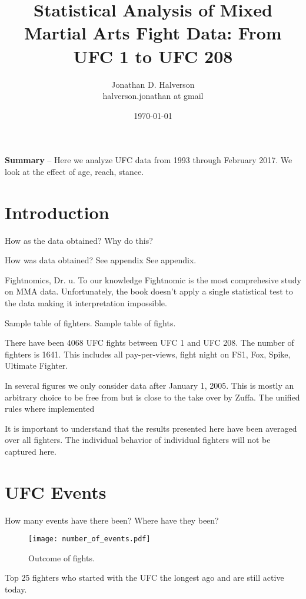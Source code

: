 \documentclass[12pt]{article}
\title{\Huge Statistical Analysis of Mixed Martial Arts Fight Data: From UFC 1 to UFC 208}
\date{\Large \today}
\author{\Large Jonathan D. Halverson\\ \tiny halverson.jonathan at gmail}
\begin{document}
\maketitle
\noindent
\textbf{Summary} -- Here we analyze UFC data from 1993 through February 2017. We look at the effect
of age, reach, stance.

\section{Introduction}

How as the data obtained? Why do this?

How was data obtained? See appendix See appendix.

Fightnomics, Dr. u.
To our knowledge Fightnomic is the most comprehesive study on MMA
data. Unfortunately, the book doesn't apply a single statistical test
to the data making it interpretation impossible.

Sample table of fighters.
Sample table of fights.

There have been 4068 UFC fights between UFC 1 and UFC 208. The number of fighters is 1641.
This includes all pay-per-views, fight night on FS1, Fox, Spike, Ultimate Fighter.

In several figures we only consider data after January 1, 2005. This is mostly
an arbitrary choice to be free from but is close to the take over by Zuffa. The unified rules where implemented

It is important to understand that the results presented here have been
averaged over all fighters. The individual behavior of individual fighters
will not be captured here.

\section{UFC Events}

How many events have there been? Where have they been?

\begin{figure}[h]
\begin{center}
\texttt{[image: number\_of\_events.pdf]}
\caption{Outcome of fights.}
\end{center}
\end{figure}

\begin{center}
\begin{table}[h]

\caption{Top 25 fighters who started with the UFC the longest ago and are still active today.}
\end{table}
\end{center}
\end{document}
